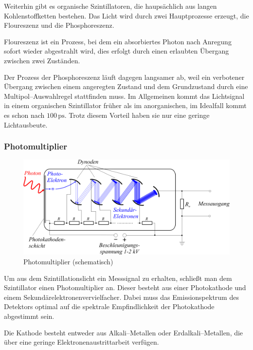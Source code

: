 \documentclass[12pt,a4paper]{scrartcl}
\numberwithin{equation}{section} %
\newcommand{\pu}[1]{\ensuremath{\mathrm{#1}}}
\begin{document}
Weiterhin gibt es organische Szintillatoren, die haupsächlich aus langen Kohlenstoffketten bestehen. Das Licht wird durch zwei Hauptprozesse erzeugt, die Floureszenz und die Phosphoreszenz. \cite{LMU}

Floureszenz ist ein Prozess, bei dem ein absorbiertes Photon nach Anregung sofort wieder abgestrahlt wird, dies erfolgt durch einen erlaubten Übergang zwischen zwei Zuständen. \cite{LMU}

Der Prozess der Phosphoreszenz läuft dagegen langsamer ab, weil ein verbotener Übergang zwischen einem angeregten Zustand und dem Grundzustand durch eine Multipol--Auswahlregel stattfinden muss. Im Allgemeinen kommt das Lichtsignal in einem organischen Szintillator früher als im anorganischen, im Idealfall kommt es schon nach $\pu{100\, ps}$. Trotz diesem Vorteil haben sie nur eine geringe Lichtausbeute. \cite{LMU}

\hypertarget{photomultiplier}{%
\subsubsection{Photomultiplier}\label{photomultiplier}}

\begin{figure}[h]
	\centering
	\includegraphics{../media/B3.4/Photomultiplier_schema_de.png}
	\caption{Photomultiplier (schematisch) \cite{abb:Photomultiplier}}
	\label{abb:Photomultiplier}
\end{figure}

\noindent
Um aus dem Szintillationslicht ein Messsignal zu erhalten, schließt man dem Szintillator einen Photomultiplier an. Dieser besteht aus einer Photokathode und einem Sekundärelektronenvervielfacher. Dabei muss das Emissionspektrum des Detektors optimal auf die spektrale Empfindlichkeit der Photokathode abgestimmt sein.

Die Kathode besteht entweder aus Alkali--Metallen oder Erdalkali--Metallen, die über eine geringe Elektronenaustrittarbeit verfügen.
\end{document}

